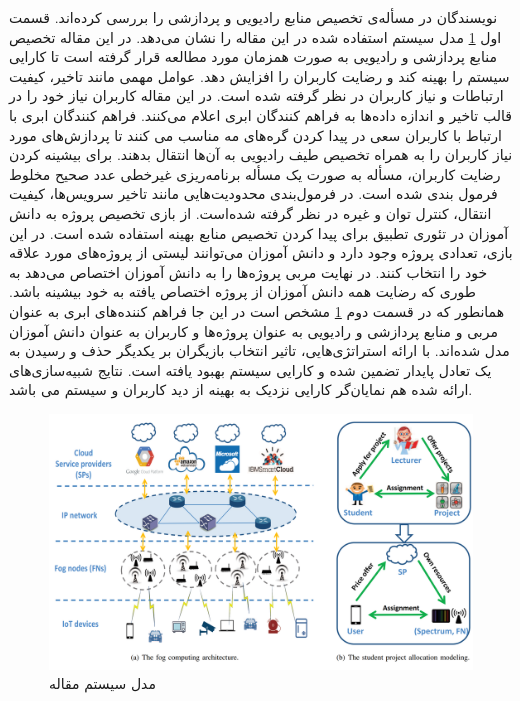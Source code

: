     نویسندگان در \cite{gu2018joint} مسأله‌ی تخصیص منابع رادیویی و پردازشی را بررسی کرده‌اند.
    قسمت اول \cref{fig:chapter_2:system_model_gu2018joint} مدل سیستم استفاده شده در این مقاله را نشان می‌دهد.
    در این مقاله تخصیص منابع پردازشی و رادیویی به صورت همزمان مورد مطالعه قرار گرفته است تا کارایی سیستم را بهینه کند و رضایت کاربران را افزایش دهد.
    عوامل مهمی مانند تاخیر، کیفیت ارتباطات و نیاز کاربران در نظر گرفته شده است.
    در این مقاله کاربران نیاز خود را در قالب تاخیر و اندازه داده‌ها به فراهم کنندگان ابری اعلام می‌کنند.
    فراهم کنندگان ابری با ارتباط با کاربران سعی در پیدا کردن گره‌های مه مناسب می کنند تا پردازش‌های مورد نیاز کاربران را به همراه تخصیص طیف رادیویی به آن‌ها انتقال بدهند.
    برای بیشینه کردن رضایت کاربران، مسأله به صورت یک مسأله برنامه‌ریزی غیرخطی عدد صحیح مخلوط فرمول بندی شده است.
    در فرمول‌بندی محدودیت‌هایی مانند تاخیر سرویس‌ها، کیفیت انتقال، کنترل توان و غیره در نظر گرفته شده‌است.
    از بازی تخصیص پروژه به دانش آموزان در تئوری تطبیق برای پیدا کردن تخصیص منابع بهینه استفاده شده است.
    در این بازی، تعدادی پروژه وجود دارد و دانش آموزان می‌توانند لیستی از پروژه‌های مورد علاقه خود را انتخاب کنند.
    در نهایت مربی پروژه‌ها را به دانش آموزان اختصاص می‌دهد به طوری که رضایت همه دانش آموزان از پروژه اختصاص یافته به خود بیشینه باشد.
    همانطور که در قسمت دوم \cref{fig:chapter_2:system_model_gu2018joint} مشخص است در این جا فراهم کننده‌های ابری به عنوان مربی و منابع پردازشی و رادیویی به عنوان پروژه‌ها و کاربران به عنوان دانش آموزان مدل شده‌اند.
    با ارائه استراتژی‌هایی، تاثیر انتخاب بازیگران بر یکدیگر حذف و رسیدن به یک تعادل پایدار تضمین شده و کارایی سیستم بهبود یافته است.
    نتایج شبیه‌سازی‌های ارائه شده هم نمایان‌گر کارایی نزدیک به بهینه از دید کاربران و سیستم می باشد.

    \begin{figure}[h]
      \centerline{\includegraphics[width=12cm]{graphics/chapter_2/system_model_gu2018joint}}
      \caption{مدل سیستم مقاله \cite{gu2018joint}}
      \label{fig:chapter_2:system_model_gu2018joint}
    \end{figure}

